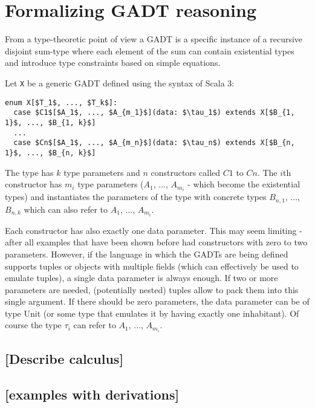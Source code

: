 \chapter{Formalizing GADT reasoning}

From a type-theoretic point of view a GADT is a specific instance of a recursive disjoint sum-type where each element of the sum can contain existential types and introduce type constraints based on simple equations.

Let \texttt{X} be a generic GADT defined using the syntax of Scala 3:

\begin{lstlisting}[mathescape=true]
enum X[$T_1$, ..., $T_k$]:
  case $C1$[$A_1$, ..., $A_{m_1}$](data: $\tau_1$) extends X[$B_{1, 1}$, ..., $B_{1, k}$]
  ...
  case $Cn$[$A_1$, ..., $A_{m_n}$](data: $\tau_n$) extends X[$B_{n, 1}$, ..., $B_{n, k}$]
\end{lstlisting}

The type has $k$ type parameters and $n$ constructors called $C1$ to $Cn$. The $i$th constructor has $m_i$ type parameters ($A_1$, ..., $A_{m_i}$ - which become the existential types) and instantiates the parameters of the type with concrete types $B_{n, 1}$, ..., $B_{n, k}$ which can also refer to $A_1$, ..., $A_{m_i}$. 

Each constructor has also exactly one data parameter. This may seem limiting - after all examples that have been shown before had constructors with zero to two parameters. However, if the language in which the GADTs are being defined supports tuples or objects with multiple fields (which can effectively be used to emulate tuples), a single data parameter is always enough. If two or more parameters are needed, (potentially nested) tuples allow to pack them into this single argument. If there should be zero parameters, the data parameter can be of type Unit (or some type that emulates it by having exactly one inhabitant). Of course the type $\tau_{i}$ can refer to $A_1$, ..., $A_{m_i}$.



\section{[Describe calculus]}
\section{[examples with derivations]}